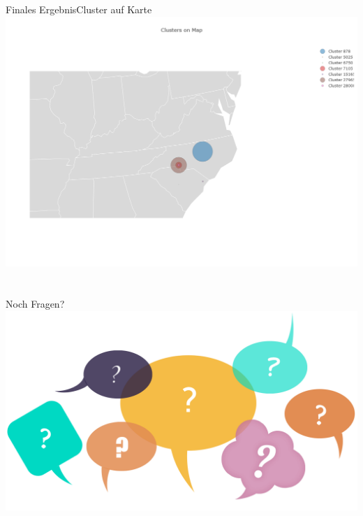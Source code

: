 \documentclass[12pt, xcolor={usenames,dvipsnames,svgnames,x11names,table}]{beamer}
\begin{document}
	\begin{frame}{Finales Ergebnis}{Cluster auf Karte}
		\center\includegraphics[width=.9\textwidth, clip=true, trim=0mm 0mm 0mm 0mm]{twitter_map}
	\end{frame}
	
	
	
	\section{}
	\begin{frame}{Noch Fragen?}
		\includegraphics[width=\textwidth]{fragen}
	\end{frame}
\end{document}
